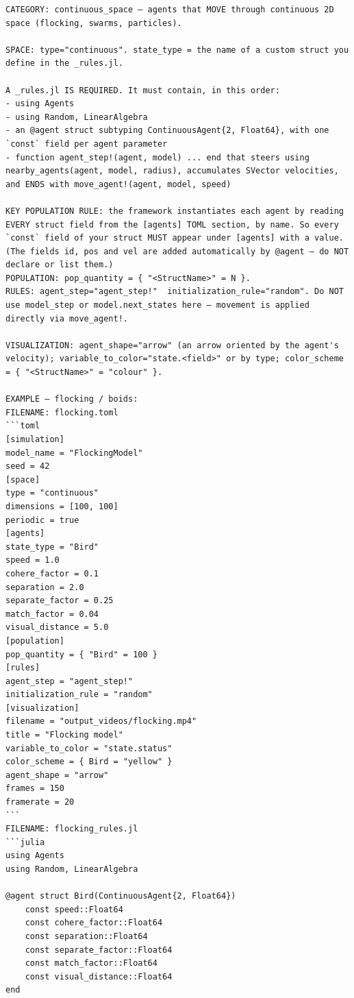 \documentclass[runningheads]{llncs}
\begin{document}
\begin{lstlisting}[style=cellprompt]
CATEGORY: continuous_space — agents that MOVE through continuous 2D space (flocking, swarms, particles).

SPACE: type="continuous". state_type = the name of a custom struct you define in the _rules.jl.

A _rules.jl IS REQUIRED. It must contain, in this order:
- using Agents
- using Random, LinearAlgebra
- an @agent struct subtyping ContinuousAgent{2, Float64}, with one `const` field per agent parameter
- function agent_step!(agent, model) ... end that steers using nearby_agents(agent, model, radius), accumulates SVector velocities, and ENDS with move_agent!(agent, model, speed)

KEY POPULATION RULE: the framework instantiates each agent by reading EVERY struct field from the [agents] TOML section, by name. So every `const` field of your struct MUST appear under [agents] with a value. (The fields id, pos and vel are added automatically by @agent — do NOT declare or list them.)
POPULATION: pop_quantity = { "<StructName>" = N }.
RULES: agent_step="agent_step!"  initialization_rule="random". Do NOT use model_step or model.next_states here — movement is applied directly via move_agent!.

VISUALIZATION: agent_shape="arrow" (an arrow oriented by the agent's velocity); variable_to_color="state.<field>" or by type; color_scheme = { "<StructName>" = "colour" }.

EXAMPLE — flocking / boids:
FILENAME: flocking.toml
```toml
[simulation]
model_name = "FlockingModel"
seed = 42
[space]
type = "continuous"
dimensions = [100, 100]
periodic = true
[agents]
state_type = "Bird"
speed = 1.0
cohere_factor = 0.1
separation = 2.0
separate_factor = 0.25
match_factor = 0.04
visual_distance = 5.0
[population]
pop_quantity = { "Bird" = 100 }
[rules]
agent_step = "agent_step!"
initialization_rule = "random"
[visualization]
filename = "output_videos/flocking.mp4"
title = "Flocking model"
variable_to_color = "state.status"
color_scheme = { Bird = "yellow" }
agent_shape = "arrow"
frames = 150
framerate = 20
```
FILENAME: flocking_rules.jl
```julia
using Agents
using Random, LinearAlgebra

@agent struct Bird(ContinuousAgent{2, Float64})
    const speed::Float64
    const cohere_factor::Float64
    const separation::Float64
    const separate_factor::Float64
    const match_factor::Float64
    const visual_distance::Float64
end


\end{lstlisting}
\end{document}
